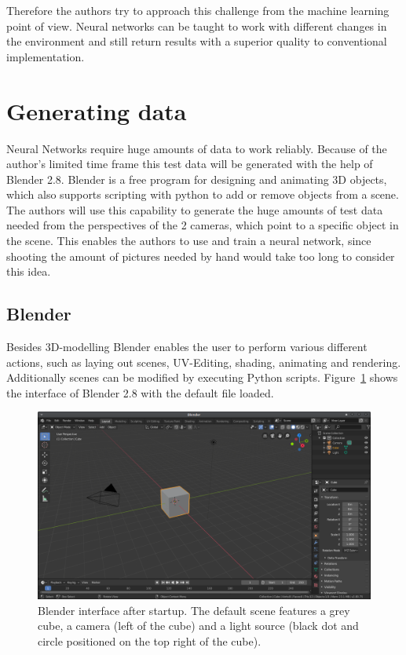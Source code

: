 Therefore the authors try to approach this challenge from the machine learning point of view. Neural networks can be taught to work with different changes in the environment and still return results with a superior quality to conventional implementation.

\section{Generating data}
Neural Networks require huge amounts of data to work reliably. Because of the author's limited time frame this test data will be generated with the help of Blender 2.8. Blender is a free program for designing and animating 3D objects, which also supports scripting with python to add or remove objects from a scene. The authors will use this capability to generate the huge amounts of test data needed from the perspectives of the 2 cameras, which point to a specific object in the scene. This enables the authors to use and train a neural network, since shooting the amount of pictures needed by hand would take too long to consider this idea.

\subsection{Blender}
Besides 3D-modelling Blender enables the user to perform various different actions, such as laying out scenes, UV-Editing, shading, animating and rendering. Additionally scenes can be modified by executing Python scripts. Figure~\ref{pic:methodology_generatingData_blender_startscreen} shows the interface of Blender 2.8 with the default file loaded.

\begin{figure}[h!]
	\centering
	\includegraphics[width=6.5in]{img/methodology_generatingData_blender_startscreen.png}
	\caption{Blender interface after startup. The default scene features a grey cube, a camera (left of the cube) and a light source (black dot and circle positioned on the top right of the cube).}
	\label{pic:methodology_generatingData_blender_startscreen}
\end{figure}

